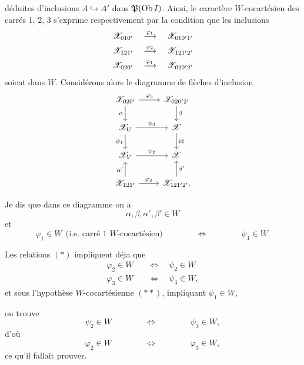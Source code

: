 
déduites d'inclusions $A \hookrightarrow A'$ dans $\mathfrak{P}(\operatorname{Ob} I)$. Ainsi, le caractère $W$-cocartésien des carrés 1, 2, 3 s'exprime respectivement par la condition que les inclusions
\[
\begin{aligned}
\cX_{010'} \quad &\xrightarrow{\varphi_1} \quad \cX_{010'1'} \\
\cX_{121'} \quad &\xrightarrow{\varphi_2} \quad \cX_{121'2'} \\
\cX_{020'} \quad &\xrightarrow{\varphi_1} \quad \cX_{020'2'} %
\end{aligned}
\]
soient dans $W$. Considérons alors le diagramme de flèches d'inclusion
\[
\begin{tikzcd}[ampersand replacement=\&]
\cX_{020'} \arrow[r, "\varphi_3"] \arrow[d, "\alpha"'] \& \cX_{020'2'} \arrow[d, "\beta"] \\
\cX_U \arrow[r, "\psi_3"] \arrow[d, "\psi_1"'] \& \cX \arrow[d, "\mathrm{id}"] \\
\cX_V \arrow[r, "\psi_2"] \& \cX \\
\cX_{121'} \arrow[r, "\varphi_2"] \arrow[u, "\alpha'"] \& \cX_{121'2'}. \arrow[u, "\beta'"']
\end{tikzcd}
\]

Je dis que dans ce diagramme on a
\[
\alpha, \beta, \alpha', \beta' \in W
\tag*{$(\ast)$}
\]
et
\[
\varphi_1 \in W \ \ \text{(i.e. carré 1 $W$-cocartésien)} \qquad\qquad \Longleftrightarrow \qquad\qquad \psi_1 \in W.
\tag*{$(\ast\ast)$}
\]

Les relations $(\ast)$ impliquent déja que %
\[
\begin{aligned}
\varphi_2 \in W \quad &\Longleftrightarrow \quad \psi_2 \in W \\
\varphi_3 \in W \quad &\Longleftrightarrow \quad \psi_3 \in W,
\end{aligned}
\]
et sous l'hypothèse $W$-cocartésienne $(\ast\ast)$, impliquant $\psi_1 \in W$,


on trouve
\[
\psi_2 \in W \qquad\qquad \Longleftrightarrow \qquad\qquad \psi_3 \in W,
\]
d'où
\[
\varphi_2 \in W \qquad\qquad \Longleftrightarrow \qquad\qquad \varphi_3 \in W,
\]
ce qu'il fallait prouver.

